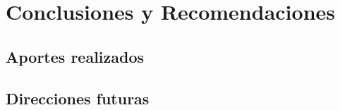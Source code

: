 
\chapter{Conclusiones y Recomendaciones}
\section{Aportes realizados}
\section{Direcciones futuras}
